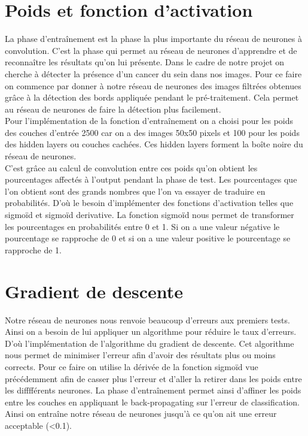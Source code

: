 \documentclass[a4paper,11pt]{report}
\begin{document}
\section{Poids et fonction d'activation}
La phase d'entraînement est la phase la plus importante du réseau de neurones à convolution. C'est la phase qui permet au réseau de neurones
d'apprendre et de reconnaître les résultats qu'on lui présente. Dans le cadre
de notre projet on cherche à détecter la présence d'un cancer du sein dans nos
images. Pour ce faire on commence par donner à notre réseau de neurones
des images filtrées obtenues grâce à la détection des bords appliquée pendant
le pré-traitement. Cela permet au réseau de neurones de faire la détection
plus facilement. \\
Pour l'implémentation de la fonction d'entraînement on a
choisi pour les poids des couches d'entrée 2500 car on a des images 50x50
pixels et 100 pour les poids des hidden layers ou couches cachées. Ces hidden layers forment la boîte noire du réseau de neurones.\\
C'est grâce au
calcul de convolution entre ces poids qu'on obtient les pourcentages affectés
à l'output pendant la phase de test. Les pourcentages que l'on obtient sont
des grands nombres que l'on va essayer de traduire en probabilités. D'où le besoin d'implémenter des fonctions d'activation telles que sigmoïd et sigmoïd
derivative. La fonction sigmoïd nous permet de transformer les pourcentages
en probabilités entre 0 et 1. Si on a une valeur négative le pourcentage se
rapproche de 0 et si on a une valeur positive le pourcentage se rapproche de
1.


\section{Gradient de descente}
Notre réseau de neurones nous renvoie beaucoup d'erreurs aux premiers
tests. Ainsi on a besoin de lui appliquer un algorithme pour réduire le taux
d'erreurs. D'où l'implémentation de l'algorithme du gradient de descente.
Cet algorithme nous permet de minimiser l'erreur afin d'avoir des résultats
plus ou moins corrects. Pour ce faire on utilise la dérivée de la fonction sigmoïd vue précédemment afin de casser plus l'erreur et d'aller la retirer dans
les poids entre les difffférents neurones. La phase d'entraînement permet ainsi
d'affiner les poids entre les couches en appliquant le back-propagating sur
l'erreur de classification. Ainsi on entraîne notre réseau de neurones jusqu'à
ce qu'on ait une erreur acceptable (<0.1).
\end{document}
